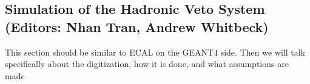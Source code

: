 
\subsection{Simulation of the Hadronic Veto System (Editors: Nhan Tran, Andrew Whitbeck)}

This section should be similar to ECAL on the GEANT4 side.  
Then we will talk specifically about the digitization, how it is done, and what assumptions are made